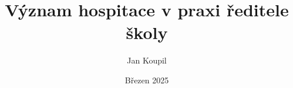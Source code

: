 

\author{Jan Koupil}
\title{Význam hospitace v praxi ředitele školy}
\date{Březen 2025}
\maketitle



